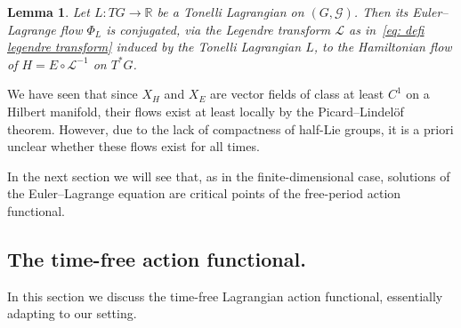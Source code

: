 \documentclass[11pt,reqno]{amsart}
\theoremstyle{plain}
\newtheorem{lem}[thm]{Lemma}
\theoremstyle{definition}
\theoremstyle{plain} %
\newtheorem{lem}[lem]{Lemma}
\theoremstyle{definition} %
\numberwithin{equation}{section}
\def\G{\mathcal{G}}
\def\RR{{\mathbb R}}
\begin{document}
\begin{lem}\label{lem: legendre transform conjugates ELE flow and Hamiltonian flow}
Let \( L \colon TG \to \RR \) be a Tonelli Lagrangian on \( (G, \G) \). 
Then its Euler–Lagrange flow \( \Phi_L \) 
is conjugated, via the Legendre transform \( \mathcal{L} \) as in~\eqref{eq: defi legendre transform} 
induced by the Tonelli Lagrangian \( L \), 
to the Hamiltonian flow of \( H = E \circ \mathcal L^{-1} \) on \( T^*G \).
\end{lem}

We have seen that since $X_H$ and $X_E$ are vector fields of class at least $C^1$ on a Hilbert manifold, their flows exist at least locally by the Picard–Lindelöf theorem. 
However, due to the lack of compactness of half-Lie groups, it is a priori unclear whether these flows exist for all times.

In the next section we will see that, as in the finite-dimensional case, solutions of the Euler–Lagrange equation are critical points of the free-period action functional. 
\subsection{The time-free action functional.} In this section we discuss the time-free Lagrangian action functional, essentially adapting \cite{AbbondandoloSchwarz2009} to our setting.

\medskip
\end{document}
